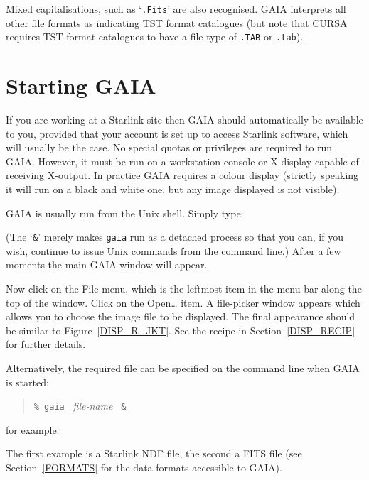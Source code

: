 \documentclass[twoside,11pt]{starlink}
\begin{document}
Mixed capitalisations, such as `\texttt{.Fits}' are also recognised.  GAIA
interprets all other file formats as indicating TST format catalogues (but
note that CURSA requires TST format catalogues to have a file-type of \texttt{.TAB} or \texttt{.tab}).


\section{\label{START}Starting GAIA}

If you are working at a Starlink site then GAIA should automatically
be available to you, provided that your account is set up to access
Starlink software, which will usually be the case.  No special quotas or
privileges are required to run GAIA.  However, it must be run on a
workstation console or X-display capable of receiving X-output.  In
practice GAIA requires a colour display (strictly speaking it will run on
a black and white one, but any image displayed is not visible).

GAIA is usually run from the Unix shell.  Simply type:

\begin{terminalv}
\end{terminalv}

(The `\texttt{\&}' merely makes \texttt{gaia} run as a detached process so that
you can, if you wish, continue to issue Unix commands from the command
line.)  After a few moments the main GAIA window will appear.

Now click on the \textsf{File} menu, which is the leftmost item in the
menu-bar along the top of the window.  Click on the \textsf{Open\ldots}
item.  A file-picker window appears which allows you to choose the
image file to be displayed.  The final appearance should be similar to
Figure~\ref{DISP_R_JKT}.  See the recipe in Section~\ref{DISP_RECIP} for
further details.

Alternatively, the required file can be specified on the command line
when GAIA is started:

\begin{quote}
\texttt{\%  gaia} \textit{~file-name} \texttt{~\&}
\end{quote}

for example:

\begin{terminalv}
\end{terminalv}

The first example is a Starlink NDF file, the second a FITS file (see
Section~\ref{FORMATS} for the data formats accessible to GAIA).
\end{document}
